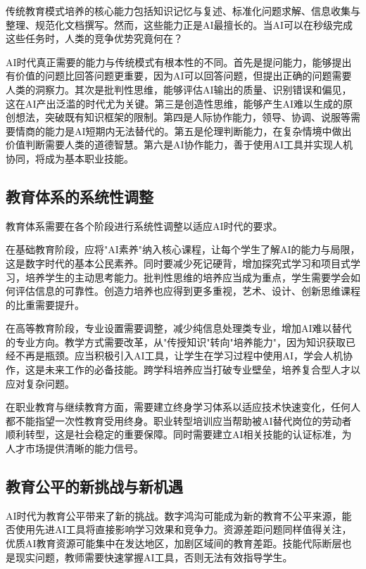 传统教育模式培养的核心能力包括知识记忆与复述、标准化问题求解、信息收集与整理、规范化文档撰写。然而，这些能力正是AI最擅长的。当AI可以在秒级完成这些任务时，人类的竞争优势究竟何在？

AI时代真正需要的能力与传统模式有根本性的不同。首先是提问能力，能够提出有价值的问题比回答问题更重要，因为AI可以回答问题，但提出正确的问题需要人类的洞察力。其次是批判性思维，能够评估AI输出的质量、识别错误和偏见，这在AI产出泛滥的时代尤为关键。第三是创造性思维，能够产生AI难以生成的原创想法，突破既有知识框架的限制。第四是人际协作能力，领导、协调、说服等需要情商的能力是AI短期内无法替代的。第五是伦理判断能力，在复杂情境中做出价值判断需要人类的道德智慧。第六是AI协作能力，善于使用AI工具并实现人机协同，将成为基本职业技能。

\subsection{教育体系的系统性调整}

教育体系需要在各个阶段进行系统性调整以适应AI时代的要求。

在基础教育阶段，应将"AI素养"纳入核心课程，让每个学生了解AI的能力与局限，这是数字时代的基本公民素养。同时要减少死记硬背，增加探究式学习和项目式学习，培养学生的主动思考能力。批判性思维的培养应当成为重点，学生需要学会如何评估信息的可靠性。创造力培养也应得到更多重视，艺术、设计、创新思维课程的比重需要提升。

在高等教育阶段，专业设置需要调整，减少纯信息处理类专业，增加AI难以替代的专业方向。教学方式需要改革，从"传授知识"转向"培养能力"，因为知识获取已经不再是瓶颈。应当积极引入AI工具，让学生在学习过程中使用AI，学会人机协作，这是未来工作的必备技能。跨学科培养应当打破专业壁垒，培养复合型人才以应对复杂问题。

在职业教育与继续教育方面，需要建立终身学习体系以适应技术快速变化，任何人都不能指望一次性教育受用终身。职业转型培训应当帮助被AI替代岗位的劳动者顺利转型，这是社会稳定的重要保障。同时需要建立AI相关技能的认证标准，为人才市场提供清晰的能力信号。

\subsection{教育公平的新挑战与新机遇}

AI时代为教育公平带来了新的挑战。数字鸿沟可能成为新的教育不公平来源，能否使用先进AI工具将直接影响学习效果和竞争力。资源差距问题同样值得关注，优质AI教育资源可能集中在发达地区，加剧区域间的教育差距。技能代际断层也是现实问题，教师需要快速掌握AI工具，否则无法有效指导学生。


